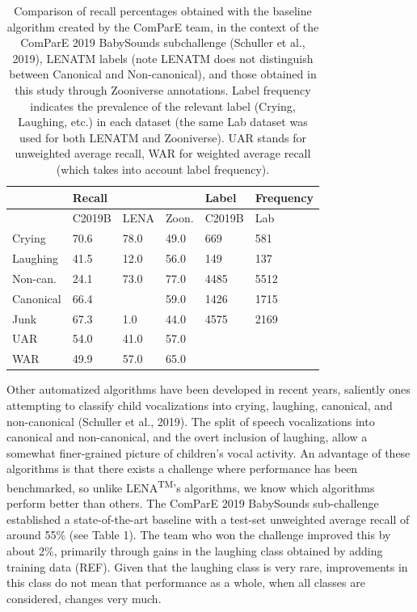 \documentclass[english,,man,floatsintext]{apa6}
\begin{document}
\begin{table}

\caption{\label{tab:tab-LENA-challenge}Comparison of recall percentages obtained with the baseline algorithm created by the ComParE team, in the context of the ComParE 2019 BabySounds subchallenge (Schuller et al., 2019), LENATM labels (note LENATM does not distinguish between Canonical and Non-canonical), and those obtained in this study through Zooniverse annotations. Label frequency indicates the prevalence of the relevant label (Crying, Laughing, etc.) in each dataset (the same Lab dataset was used for both LENATM and Zooniverse). UAR stands for unweighted average recall, WAR for weighted average recall (which takes into account label frequency).}
\centering
\begin{tabular}[t]{l|l|l|l|l|l}
\hline
 & Recall &  &  & Label & Frequency\\
\hline
 & C2019B & LENA & Zoon. & C2019B & Lab\\
\hline
Crying & 70.6 & 78.0 & 49.0 & 669 & 581\\
\hline
Laughing & 41.5 & 12.0 & 56.0 & 149 & 137\\
\hline
Non-can. & 24.1 & 73.0 & 77.0 & 4485 & 5512\\
\hline
Canonical & 66.4 &  & 59.0 & 1426 & 1715\\
\hline
Junk & 67.3 & 1.0 & 44.0 & 4575 & 2169\\
\hline
UAR & 54.0 & 41.0 & 57.0 &  & \\
\hline
WAR & 49.9 & 57.0 & 65.0 &  & \\
\hline
\end{tabular}
\end{table}

Other automatized algorithms have been developed in recent years, saliently ones attempting to classify child vocalizations into crying, laughing, canonical, and non-canonical (Schuller et al., 2019). The split of speech vocalizations into canonical and non-canonical, and the overt inclusion of laughing, allow a somewhat finer-grained picture of children's vocal activity. An advantage of these algorithms is that there exists a challenge where performance has been benchmarked, so unlike LENA\textsuperscript{TM}'s algorithms, we know which algorithms perform better than others. The ComParE 2019 BabySounds sub-challenge established a state-of-the-art baseline with a test-set unweighted average recall of around 55\% (see Table 1). The team who won the challenge improved this by about 2\%, primarily through gains in the laughing class obtained by adding training data (REF). Given that the laughing class is very rare, improvements in this class do not mean that performance as a whole, when all classes are considered, changes very much.
\end{document}
